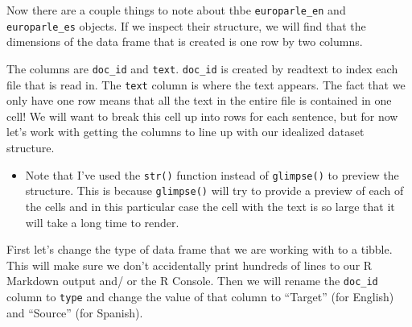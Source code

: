 \documentclass[
]{article}
\newenvironment{Shaded}{\begin{snugshade}}{\end{snugshade}}
\newcommand{\CommentTok}[1]{\textcolor[rgb]{0.56,0.35,0.01}{\textit{#1}}}
\newcommand{\FunctionTok}[1]{\textcolor[rgb]{0.00,0.00,0.00}{#1}}
\newcommand{\NormalTok}[1]{#1}
\newenvironment{rmdblock}[1]
  {\begin{shaded*}
  \begin{itemize}
  \renewcommand{\labelitemi}{
    \raisebox{-.5\height}[0pt][0pt]{
      {\setkeys{Gin}{width=2em,keepaspectratio}\texttt{[image: assets/images/\#1]}}
    }
  }
  \item
  }
  {
  \end{itemize}
  \end{shaded*}
  }
\newenvironment{rmdtip}
  {\begin{rmdblock}{tip}}
  {\end{rmdblock}}
\begin{document}
Now there are a couple things to note about thbe \texttt{europarle\_en} and \texttt{europarle\_es} objects. If we inspect their structure, we will find that the dimensions of the data frame that is created is one row by two columns.

\begin{Shaded}
\end{Shaded}

The columns are \texttt{doc\_id} and \texttt{text}. \texttt{doc\_id} is created by readtext to index each file that is read in. The \texttt{text} column is where the text appears. The fact that we only have one row means that all the text in the entire file is contained in one cell! We will want to break this cell up into rows for each sentence, but for now let's work with getting the columns to line up with our idealized dataset structure.

\begin{rmdtip}
Note that I've used the \texttt{str()} function instead of
\texttt{glimpse()} to preview the structure. This is because
\texttt{glimpse()} will try to provide a preview of each of the cells
and in this particular case the cell with the text is so large that it
will take a long time to render.
\end{rmdtip}

First let's change the type of data frame that we are working with to a tibble. This will make sure we don't accidentally print hundreds of lines to our R Markdown output and/ or the R Console. Then we will rename the \texttt{doc\_id} column to \texttt{type} and change the value of that column to ``Target'' (for English) and ``Source'' (for Spanish).
\end{document}
